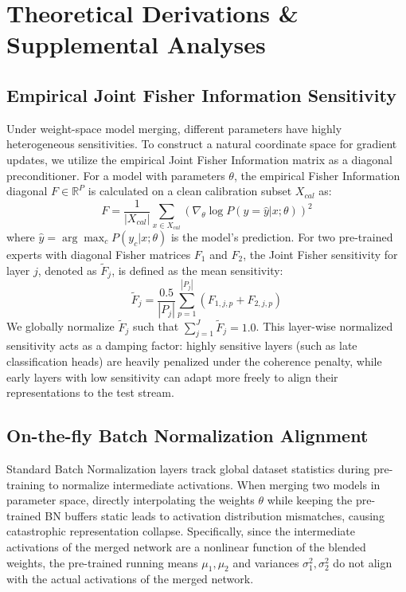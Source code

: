 \documentclass{article}
\theoremstyle{definition}
\theoremstyle{remark}
\begin{document}
\section{Theoretical Derivations \& Supplemental Analyses}
\label{appendix:theory}

\subsection{Empirical Joint Fisher Information Sensitivity}
Under weight-space model merging, different parameters have highly heterogeneous sensitivities. To construct a natural coordinate space for gradient updates, we utilize the empirical Joint Fisher Information matrix as a diagonal preconditioner. For a model with parameters $\theta$, the empirical Fisher Information diagonal $F \in \mathbb{R}^P$ is calculated on a clean calibration subset $X_{cal}$ as:
\begin{equation}
F = \frac{1}{|X_{cal}|} \sum_{x \in X_{cal}} \left( \nabla_\theta \log P(y = \hat{y} | x; \theta) \right)^2
\end{equation}
where $\hat{y} = \arg\max_c P(y_c|x; \theta)$ is the model's prediction. For two pre-trained experts with diagonal Fisher matrices $F_1$ and $F_2$, the Joint Fisher sensitivity for layer $j$, denoted as $\tilde{F}_j$, is defined as the mean sensitivity:
\begin{equation}
\tilde{F}_j = \frac{0.5}{|P_j|} \sum_{p=1}^{|P_j|} \left( F_{1, j, p} + F_{2, j, p} \right)
\end{equation}
We globally normalize $\tilde{F}_j$ such that $\sum_{j=1}^J \tilde{F}_j = 1.0$. This layer-wise normalized sensitivity acts as a damping factor: highly sensitive layers (such as late classification heads) are heavily penalized under the coherence penalty, while early layers with low sensitivity can adapt more freely to align their representations to the test stream.

\subsection{On-the-fly Batch Normalization Alignment}
Standard Batch Normalization layers track global dataset statistics during pre-training to normalize intermediate activations. When merging two models in parameter space, directly interpolating the weights $\theta$ while keeping the pre-trained BN buffers static leads to activation distribution mismatches, causing catastrophic representation collapse. Specifically, since the intermediate activations of the merged network are a nonlinear function of the blended weights, the pre-trained running means $\mu_1, \mu_2$ and variances $\sigma_1^2, \sigma_2^2$ do not align with the actual activations of the merged network.
\end{document}
